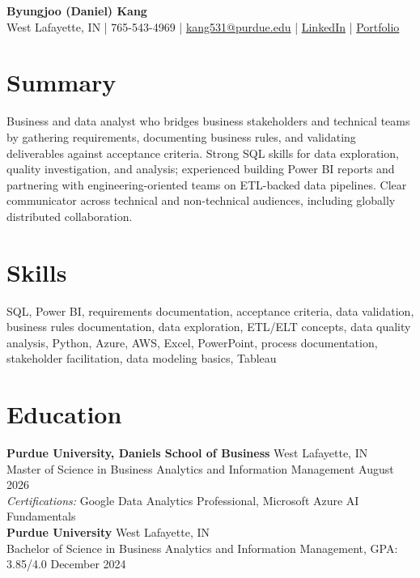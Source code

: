 \documentclass[11pt,a4paper]{article}
\begin{document}
\pagestyle{empty}

\begin{center}
    {\Huge \textbf{Byungjoo (Daniel) Kang}} \\[4pt]
    West Lafayette, IN | 765-543-4969 | \href{mailto:kang531@purdue.edu}{kang531@purdue.edu} |
    \href{https://www.linkedin.com/in/daniel-byungjoo-kang/}{LinkedIn} | \href{https://daniel-kang-vs.github.io}{Portfolio}
\end{center}

\section*{Summary}
Business and data analyst who bridges business stakeholders and technical teams by gathering requirements, documenting business rules, and validating deliverables against acceptance criteria. Strong SQL skills for data exploration, quality investigation, and analysis; experienced building Power BI reports and partnering with engineering-oriented teams on ETL-backed data pipelines. Clear communicator across technical and non-technical audiences, including globally distributed collaboration.

\section*{Skills}
SQL, Power BI, requirements documentation, acceptance criteria, data validation, business rules documentation, data exploration, ETL/ELT concepts, data quality analysis, Python, Azure, AWS, Excel, PowerPoint, process documentation, stakeholder facilitation, data modeling basics, Tableau

\section*{Education}
\noindent
\textbf{Purdue University, Daniels School of Business} \hfill West Lafayette, IN \\
Master of Science in Business Analytics and Information Management \hfill August 2026 \\
\textit{Certifications:} Google Data Analytics Professional, Microsoft Azure AI Fundamentals \\[6pt]
\textbf{Purdue University} \hfill West Lafayette, IN \\
Bachelor of Science in Business Analytics and Information Management, GPA: 3.85/4.0 \hfill December 2024
\end{document}
